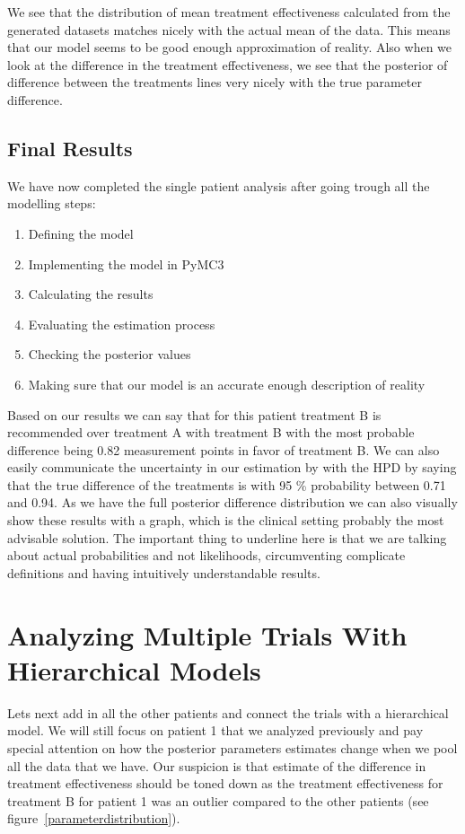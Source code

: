 \documentclass[12pt,a4paper,leqno]{report}
\theoremstyle{plain}
\theoremstyle{definition}
\theoremstyle{remark}
\begin{document}
We see that the distribution of mean treatment effectiveness calculated from the
generated datasets matches nicely with the actual mean of the data. This means that our
model seems to be good enough approximation of reality. Also when we look at the difference in the treatment effectiveness,
we see that the posterior of difference between the treatments lines very nicely with the
true parameter difference.

\subsection{Final Results}

We have now completed the single patient analysis after going trough all the modelling steps:

\begin{enumerate}
    \item Defining the model
    \item Implementing the model in PyMC3
    \item Calculating the results
    \item Evaluating the estimation process
    \item Checking the posterior values
    \item Making sure that our model is an accurate enough description of reality
\end{enumerate}

Based on our results we can say that for this patient treatment B is recommended over treatment A with
treatment B with the most probable difference being 0.82 measurement points in favor of treatment B. We can also easily communicate
the uncertainty in our estimation by with the HPD by saying that the true difference of
the treatments is with 95 \% probability between 0.71 and 0.94. As we have the full
posterior difference distribution we can also visually show these results with a graph,
which is the clinical setting probably the most advisable solution. The important thing
to underline here is that we are talking about actual probabilities and not likelihoods,
circumventing complicate definitions and having intuitively understandable results.

\section{Analyzing Multiple Trials With Hierarchical Models}\label{pooling}

Lets next add in all the other patients and connect the trials with a hierarchical
model. We will still focus on patient 1 that we analyzed previously and pay special
attention on how the posterior parameters estimates change when we pool all the data
that we have. Our suspicion is that estimate of the difference in treatment effectiveness
should be toned down as the treatment effectiveness for treatment B for patient 1 was an
outlier compared to the other patients (see figure\ \ref{parameterdistribution}).
\end{document}
